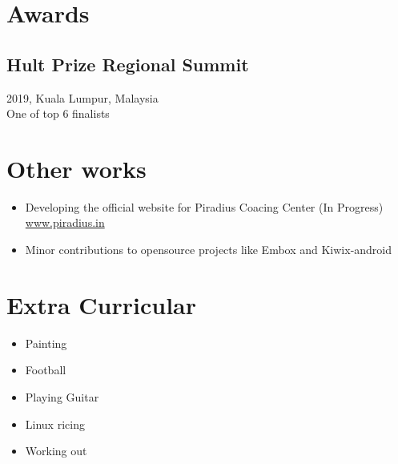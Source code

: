 \documentclass{article}
\begin{document}
\section{Awards}
\subsection{Hult Prize Regional Summit}
2019, Kuala Lumpur, Malaysia\\
One of top 6 finalists


\section{Other works} 
\begin{itemize}
	\item Developing the official website for Piradius Coacing Center (In Progress)\\
	\href{https:\\www.piradius.in}{www.piradius.in}
	\item Minor contributions to opensource projects like Embox and Kiwix-android
\end{itemize}


\section{Extra Curricular}
\begin{itemize}
	\item Painting
	\item Football
	\item Playing Guitar
	\item Linux ricing
	\item Working out
\end{itemize}
\end{document}
